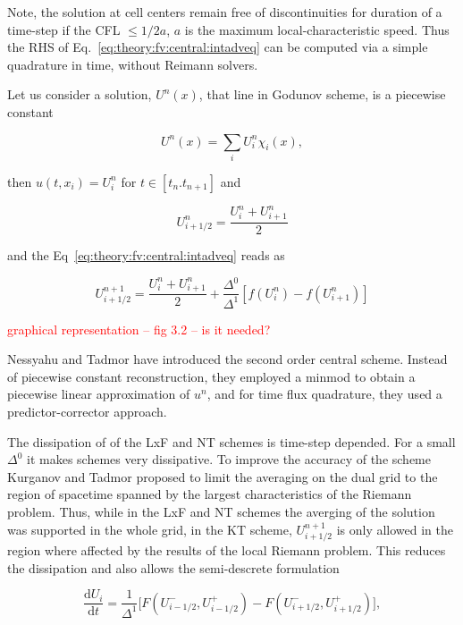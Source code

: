 Note, the solution at cell centers remain free of discontinuities for duration of a time-step if the \ac{CFL} $\leq 1/2 a$, $a$ is the maximum local-characteristic speed. Thus the \ac{RHS} of Eq.~\eqref{eq:theory:fv:central:intadveq} can be computed via a simple quadrature in time, without Reimann solvers. 

Let us consider a solution, $U^n(x)$, that line in Godunov scheme, is a piecewise constant 

\begin{equation}
U^{n}(x) = \sum_i U_{i}^{n}\chi_i(x),
\end{equation}

then $u(t,x_i) = U_{i}^{n}$ for $t\in[t_n. t_{n+1}]$ and 

\begin{equation}
U_{i+1/2}^{n} = \frac{U_i ^n + U_{i+1}^n}{2}
\end{equation}

and the Eq~\eqref{eq:theory:fv:central:intadveq} reads as

\begin{equation}
U_{i+1/2}^{n+1} = \frac{U_i ^n + U_{i+1}^n}{2} + \frac{\Delta^0}{\Delta^1}[f(U_i ^n) - f(U_{i+1} ^n)]
\end{equation}

\textcolor{red}{graphical representation -- fig 3.2 -- is it needed?}

Nessyahu and Tadmor \citep{Nessyahu:1990} have introduced the second order central scheme. Instead of piecewise constant reconstruction, they employed a minmod to obtain a piecewise linear approximation of $u^n$, and for time flux quadrature, they used a predictor-corrector approach. 

The dissipation of of the \ac{LxF} and \ac{NT} schemes is time-step depended. For a small $\Delta^0$ it makes schemes very dissipative. To improve the accuracy of the scheme Kurganov and Tadmor \citep{Kurganov:2000} proposed to limit the averaging on the dual grid to the region of spacetime spanned by the largest characteristics of the Riemann problem. Thus, while in the \ac{LxF} and \ac{NT} schemes the averging of the solution was supported in the whole grid, in the \ac{KT} scheme, $U^{n+1}_{i+1/2}$ is only allowed in the region where affected by the results of the local Riemann problem. This reduces the dissipation and also allows the semi-descrete formulation 

\begin{equation}
\frac{\text{d} U_i}{\text{d} t} = \frac{1}{\Delta^{1}}\big[F(U_{i-1/2}^{-},U_{i-1/2}^{+}) - F(U_{i+1/2}^{-},U_{i+1/2}^{+})\big],
\end{equation}


